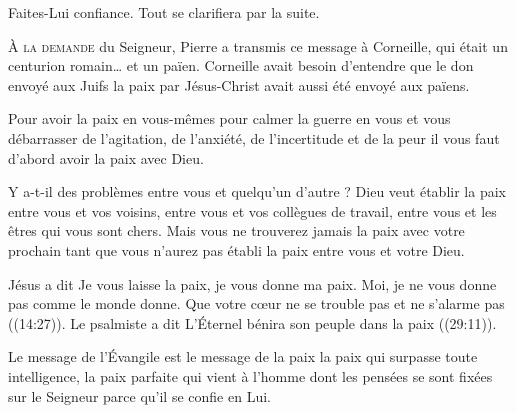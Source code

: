 Faites-Lui confiance. Tout se clarifiera par la suite.

\dvrule







\lettrine{À}{ la demande} du Seigneur, Pierre a transmis ce message à Corneille,
 qui était un centurion romain\dots{} et un païen.
 Corneille avait besoin d'entendre que le don envoyé aux Juifs
 \ocadr la paix par Jésus-Christ \fcadr{} avait aussi été envoyé aux païens.

Pour avoir la paix en vous-mêmes \ocadr pour calmer la guerre en vous
 et vous débarrasser de l'agitation, de l'anxiété, de l'incertitude
 et de la peur \fcadr{} il vous faut d'abord avoir la paix avec Dieu.


Y a-t-il des problèmes entre vous et quelqu'un d'autre ?
 Dieu veut établir la paix entre vous et vos voisins,
 entre vous et vos collègues de travail,
 entre vous et les êtres qui vous sont chers.
 Mais vous ne trouverez jamais la paix avec votre prochain
 tant que vous n'aurez pas établi la paix entre vous et votre Dieu.

Jésus a dit\frcolon{} 
 \Og Je vous laisse la paix, je vous donne ma paix.
 Moi, je ne vous donne pas comme le monde donne.
 Que votre c\oe{}ur ne se trouble pas et ne s'alarme pas \Fg{}
 ((14:27)).
 Le psalmiste a dit\frcolon{} 
 \Og L'Éternel bénira son peuple dans la paix \Fg{}
 ((29:11)).

Le message de l'Évangile est le message de la paix
 \ocadr la paix qui surpasse toute intelligence,
 la paix parfaite qui vient à l'homme dont les pensées
 se sont fixées sur le Seigneur parce qu'il se confie en Lui.

\dvrule

